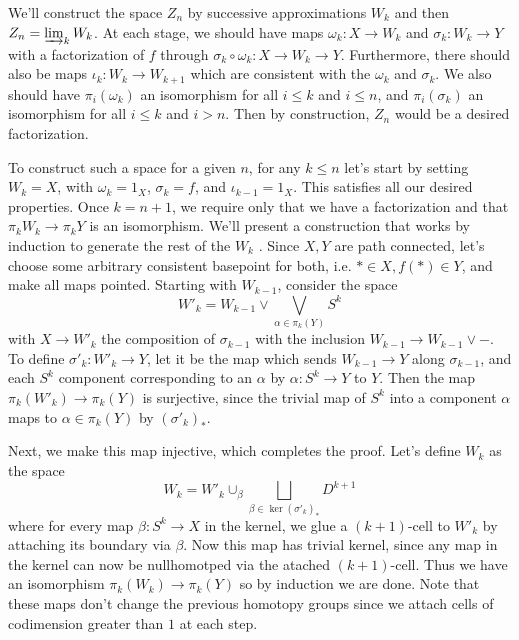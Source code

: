 \documentclass[11pt,letterpaper]{article}
\begin{document}
\begin{solution}
    \quad We'll construct the space $Z_n$ by successive approximations $W_k$ and then $Z_n = \varinjlim_k W_k$. At each stage, we should have maps $\omega_k : X \to W_k$ and $\sigma_k : W_k\to Y$ with a factorization of $f$ through $\sigma_k\circ \omega_k : X \to W_k \to Y$. Furthermore, there should also be maps $\iota_k : W_k \to W_{k+1}$ which are consistent with the $\omega_k$ and $\sigma_k$. We also should have $\pi_i(\omega_k)$ an isomorphism for all $i\leq k$ and $i\leq n$, and $\pi_i(\sigma_k)$ an isomorphism for all $i\leq k$ and $i>n$. Then by construction, $Z_n$ would be a desired factorization.
    
    \quad To construct such a space for a given $n$, for any $k\leq n$  let's start by setting $W_k = X$, with $\omega_k = 1_X$, $\sigma_k = f$, and $\iota_{k-1} = 1_X$. This satisfies all our desired properties. Once $k=n+1$, we require only that we have a factorization and that $\pi_k W_k \to \pi_k Y$ is an isomorphism. We'll present a construction that works by induction to generate the rest of the $W_k$ . Since $X,Y$ are path connected, let's choose some arbitrary consistent basepoint for both, i.e. $*\in X, f(*)\in Y$, and make all maps pointed. Starting with $W_{k-1}$, consider the space
    \[
        W'_k = W_{k-1}\vee \bigvee_{\alpha\in \pi_k(Y)} S^k
    \]
    with $X \to W'_k$ the composition of $\sigma_{k-1}$ with the inclusion $W_{k-1} \to W_{k-1}\vee -$. To define $\sigma'_k : W'_k \to Y$, let it be the map which sends $W_{k-1} \to Y$ along $\sigma_{k-1}$, and each $S^k$ component corresponding to an $\alpha$ by $\alpha : S^k \to Y$ to $Y$. Then the map $\pi_k(W'_k) \to \pi_k(Y)$ is surjective, since the trivial map of $S^k$ into a component $\alpha$ maps to $\alpha\in \pi_k(Y)$ by $(\sigma'_k)_*$.

    \quad Next, we make this map injective, which completes the proof. Let's define $W_k$ as the space
    \[
        W_k = W'_k\cup_{\beta} \bigsqcup_{\beta \in \ker (\sigma'_k)_*} D^{k+1}
    \]
    where for every map $\beta : S^k \to X$ in the kernel, we glue a $(k+1)$-cell to $W'_k$ by attaching its boundary via $\beta$. Now this map has trivial kernel, since any map in the kernel can now be nullhomotped via the atached $(k+1)$-cell. Thus we have an isomorphism $\pi_k(W_k) \to \pi_k(Y)$ so by induction we are done. Note that these maps don't change the previous homotopy groups since we attach cells of codimension greater than $1$ at each step.   
\end{solution}
\end{document}
